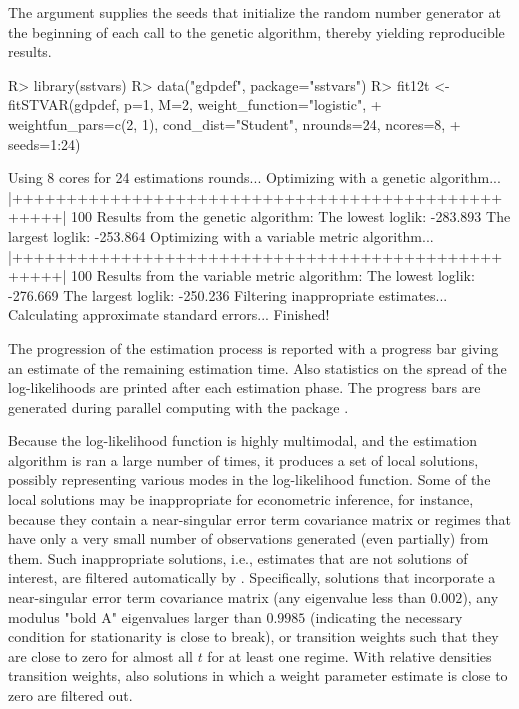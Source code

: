 \documentclass[nojss]{jss}
\begin{document}
The argument  supplies the seeds that initialize the random number generator at the beginning of each call to the genetic algorithm, thereby yielding reproducible results.
%
\begin{CodeChunk}
\begin{CodeInput}
R> library(sstvars)
R> data("gdpdef", package="sstvars")
R> fit12t <- fitSTVAR(gdpdef, p=1, M=2, weight_function="logistic",
+    weightfun_pars=c(2, 1), cond_dist="Student", nrounds=24, ncores=8,
+    seeds=1:24)
\end{CodeInput}
\begin{CodeOutput}
Using 8 cores for 24 estimations rounds...
Optimizing with a genetic algorithm...
  |++++++++++++++++++++++++++++++++++++++++++++++++++| 100%
Results from the genetic algorithm:
The lowest loglik:  -283.893
The largest loglik: -253.864
Optimizing with a variable metric algorithm...
  |++++++++++++++++++++++++++++++++++++++++++++++++++| 100%
Results from the variable metric algorithm:
The lowest loglik:  -276.669
The largest loglik: -250.236
Filtering inappropriate estimates...
Calculating approximate standard errors...
Finished!
\end{CodeOutput}
\end{CodeChunk}
%
The progression of the estimation process is reported with a progress bar giving an estimate of the remaining estimation time. Also statistics on the spread of the log-likelihoods are printed after each estimation phase. The progress bars are generated during parallel computing with the package  \citep{Solymos+Zawadzki:2020}.

Because the log-likelihood function is highly multimodal, and the estimation algorithm is ran a large number of times, it produces a set of local solutions, possibly representing various modes in the log-likelihood function. Some of the local solutions may be inappropriate for econometric inference, for instance, because they contain a near-singular error term covariance matrix or regimes that have only a very small number of observations generated (even partially) from them. Such inappropriate solutions, i.e., estimates that are not solutions of interest, are filtered automatically by . Specifically, solutions that incorporate a near-singular error term covariance matrix (any eigenvalue less than $0.002$), any modulus "bold A" eigenvalues larger than $0.9985$ (indicating the necessary condition for stationarity is close to break), or transition weights such that they are close to zero for almost all $t$ for at least one regime. With relative densities transition weights, also solutions in which a weight parameter estimate is close to zero are filtered out.
\end{document}
